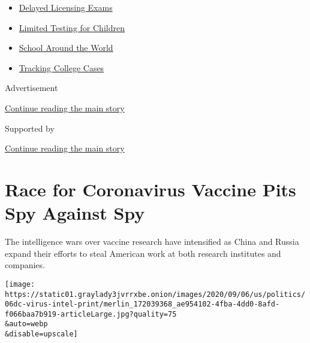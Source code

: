 \begin{itemize}
\tightlist
\item
  \href{https://www.nytimes3xbfgragh.onion/2020/09/04/us/bar-exam-coronavirus.html?name=styln-coronavirus-schools-reopening\&region=TOP_BANNER\&block=storyline_menu_recirc\&action=click\&pgtype=Article\&impression_id=1791e5a1-f27e-11ea-b383-c73395fd03d7\&variant=undefined}{Delayed
  Licensing Exams}
\item
  \href{https://www.nytimes3xbfgragh.onion/2020/09/08/upshot/children-testing-shortfalls-virus.html?name=styln-coronavirus-schools-reopening\&region=TOP_BANNER\&block=storyline_menu_recirc\&action=click\&pgtype=Article\&impression_id=17920cb0-f27e-11ea-b383-c73395fd03d7\&variant=undefined}{Limited
  Testing for Children}
\item
  \href{https://www.nytimes3xbfgragh.onion/2020/09/01/world/schools-reopen-globe-students.html?name=styln-coronavirus-schools-reopening\&region=TOP_BANNER\&block=storyline_menu_recirc\&action=click\&pgtype=Article\&impression_id=17920cb1-f27e-11ea-b383-c73395fd03d7\&variant=undefined}{School
  Around the World}
\item
  \href{https://www.nytimes3xbfgragh.onion/interactive/2020/us/covid-college-cases-tracker.html?name=styln-coronavirus-schools-reopening\&region=TOP_BANNER\&block=storyline_menu_recirc\&action=click\&pgtype=Article\&impression_id=17920cb2-f27e-11ea-b383-c73395fd03d7\&variant=undefined}{Tracking
  College Cases}
\end{itemize}

Advertisement

\protect\hyperlink{after-top}{Continue reading the main story}

Supported by

\protect\hyperlink{after-sponsor}{Continue reading the main story}

\hypertarget{race-for-coronavirus-vaccine-pits-spy-against-spy}{%
\section{Race for Coronavirus Vaccine Pits Spy Against
Spy}\label{race-for-coronavirus-vaccine-pits-spy-against-spy}}

The intelligence wars over vaccine research have intensified as China
and Russia expand their efforts to steal American work at both research
institutes and companies.

\texttt{[image: https://static01.graylady3jvrrxbe.onion/images/2020/09/06/us/politics/06dc-virus-intel-print/merlin\_172039368\_ae954102-4fba-4dd0-8afd-f066baa7b919-articleLarge.jpg?quality=75\\\&auto=webp\\\&disable=upscale]}

